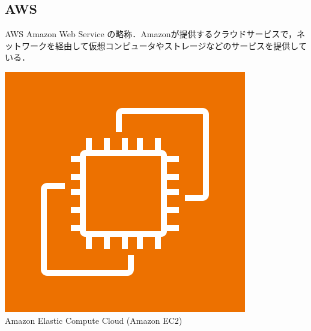 \subsection{AWS}
\begin{frame}[t]{\ftitle}
    \begin{block}{AWS}
        Amazon Web Service の略称．Amazonが提供するクラウドサービスで，ネットワークを経由して仮想コンピュータやストレージなどのサービスを提供している．\hfill\cite{2015amazon}
    \end{block}
    \begin{minipage}{.33\textwidth}
        \centering
        \includegraphics[keepaspectratio,width=\textwidth]{Arch_Amazon-EC2_64@5x.png}\\
        {\scriptsize Amazon Elastic Compute Cloud (Amazon EC2)}
    \end{minipage}
    \begin{minipage}{.33\textwidth}

\end{minipage}
\end{frame}
